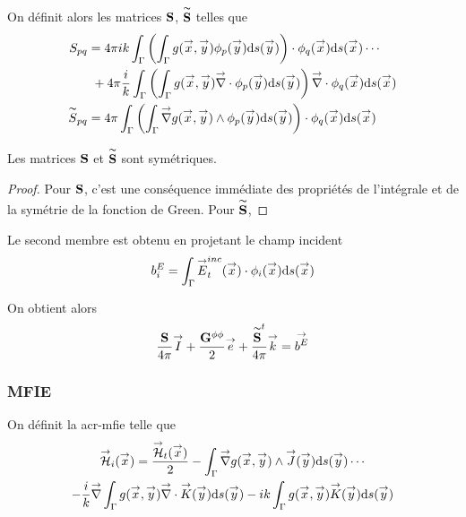       On définit alors les matrices \(\mS\), \(\mSt\) telles que
      \begin{align}
        S_{pq} 
          &= 4\pi ik \int_\Gamma \left( \int_\Gamma g(\vx,\vy) \phi_p(\vy) \dd{s}(\vy) \right) \cdot \phi_q (\vx)\dd{s}(\vx) \cdots\\
          &~+ 4\pi \frac{i}{k}\int_\Gamma \left( \int_\Gamma g(\vx,\vy) \vdiv \phi_p (\vy) \dd{s}(\vy) \right) \vdiv \phi_q(\vx)\dd{s}(\vx)\\ 
        \tilde{S}_{pq}
          &= 4\pi \int_\Gamma \left( \int_\Gamma \vgrad g(\vx,\vy) \pvect \phi_p(\vy) \dd{s}(\vy) \right) \cdot \phi_q(\vx)\dd{s}(\vx)
      \end{align}

      \begin{prop}
        Les matrices \(\mS\) et \(\mSt\) sont symétriques.
      \end{prop}
      \begin{proof}
        Pour \(\mS\), c'est une conséquence immédiate des propriétés de l'intégrale et de la symétrie de la fonction de Green.
        Pour \(\mSt\), 
      \end{proof}

      Le second membre est obtenu en projetant le champ incident 
      \begin{equation}
        b_i^E = \int_\Gamma \vE^{inc}_t(\vx) \cdot \phi_i(\vx)\dd{s}(\vx)
      \end{equation}

      On obtient alors 
      \begin{equation}
        \frac{\mS}{4\pi}\vect{I}
        + \frac{\mG{\phi}{\phi}}{2}\vect{e}
        + \frac{\mSt^t}{4\pi}\vect{k}
        = \vect{b^E}
      \end{equation}
    
    \subsubsection{MFIE}
      On définit la \gls{acr-mfie} telle que
      \begin{multline}
        \label{eq:form_int:EFIE}
        \vH_i(\vx) = 
        \frac{\vH_t(\vx)}{2} 
          - \int_\Gamma \vgrad g(\vx,\vy) \pvect \vJ(\vy) \dd{s}(\vy) \cdots \\
        - \frac{i}{k} \vgrad \int_\Gamma  g(\vx,\vy)\vdiv\vK(\vy)\dd{s}(\vy) 
          - ik \int_\Gamma g(\vx,\vy)\vK(\vy)\dd{s}(\vy)
      \end{multline}
      
